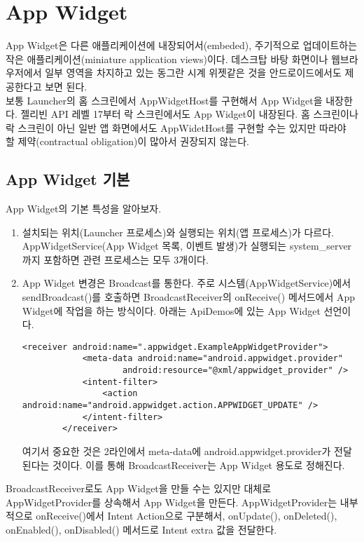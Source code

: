\section{App Widget}
App Widget은 다른 애플리케이션에 내장되어서(embeded), 주기적으로 업데이트하는 작은 애플리케이션(miniature application views)이다. 데스크탑 바탕 화면이나 웹브라우저에서 일부 영역을 차지하고 있는 동그란 시계 위젯같은 것을 안드로이드에서도 제공한다고 보면 된다.\\

보통 Launcher의 홈 스크린에서 AppWidgetHost를 구현해서 App Widget을 내장한다. 젤리빈 API 레벨 17부터 락 스크린에서도 App Widget이 내장된다. 홈 스크린이나 락 스크린이 아닌 일반 앱 화면에서도 AppWidetHost를 구현할 수는 있지만 따라야 할 제약(contractual obligation)이 많아서 권장되지 않는다.

\subsection{App Widget 기본}
App Widget의 기본 특성을 알아보자.
\begin{enumerate}
\item 설치되는 위치(Launcher 프로세스)와 실행되는 위치(앱 프로세스)가 다르다. AppWidgetService(App Widget 목록, 이벤트 발생)가 실행되는 system\_server까지 포함하면 관련 프로세스는 모두 3개이다.
\item App Widget 변경은 Broadcast를 통한다. 주로 시스템(AppWidgetService)에서 sendBroadcast()를 호출하면 BroadcastReceiver의 onReceive() 메서드에서 App Widget에 작업을 하는 방식이다.
아래는 ApiDemos에 있는 App Widget 선언이다.
\begin{lstlisting}[frame=single] 
        <receiver android:name=".appwidget.ExampleAppWidgetProvider">
            <meta-data android:name="android.appwidget.provider"
                    android:resource="@xml/appwidget_provider" />
            <intent-filter>
                <action android:name="android.appwidget.action.APPWIDGET_UPDATE" />
            </intent-filter>
        </receiver>
\end{lstlisting}
여기서 중요한 것은 2라인에서 meta-data에 android.appwidget.provider가 전달된다는 것이다. 이를 통해 BroadcastReceiver는 App Widget 용도로 정해진다.
\end{enumerate}

BroadcastReceiver로도 App Widget을 만들 수는 있지만 대체로 AppWidgetProvider를 상속해서 App Widget을 만든다. 
AppWidgetProvider는 내부적으로 onReceive()에서 Intent Action으로 구분해서, onUpdate(), onDeleted(), onEnabled(), onDisabled() 메서드로 Intent extra 값을 전달한다.\\

